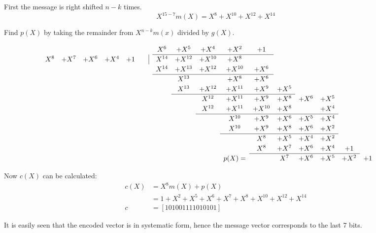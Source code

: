 \documentclass[Main]{subfiles}
\begin{document}
First the message is right shifted $n-k$ times.
\begin{equation}
X^{15-7}m(X) = X^8+X^{10}+X^{12}+X^{14}
\end{equation}

Find $p(X)$ by taking the remainder from $X^{n-k}m(x)$ divided by $g(X)$.

\[
\renewcommand\arraystretch{1.2}
\begin{array}{cccccccccccccccccc}
& & & & & X^6 & + X^5 &  +X^4 & +X^2 & +1 & & & & & & & \\
\cline{6-10}
 X^8 & + X^7 & +X^6 & +X^4 & +1 \qquad \vline & X^{14} & +X^{12} & +X^{10} & + X^8 & & & & & & & & \\
& & & & & X^{14} & + X^{13}& + X^{12} & +X^{10} & +X^6 & & & & & & & \\
\cline{6-10}
& & & & & & X^{13} & & +X^8 & +X^6 & & & & & & &\\
&  &&    &&    &  X^{13} & +X^{12} & +X^{11} & +X^9 & +X^5 & \\
\cline{7-11}
& & &&  &&    &  X^{12} & +X^{11} & +X^9 & +X^8 & +X^6 & +X^5  \\
& & &&  &&    &  X^{12} & +X^{11} & +X^{10} & +X^8 & & +X^4  \\
\cline{8-13}
&  &&    &    &   & &  & X^{10} & +X^9 & +X^6 & +X^5 & +X^4 \\
&  &&    &    &   & &  & X^{10} & +X^9 & +X^8 & +X^6 & +X^2 \\
\cline{9-13}
&  &&    &    &   & & & & X^{8} & +X^5 & +X^4 & +X^2 \\
&  &&    &    &   & & & & X^{8} & +X^7 & +X^6 & +X^4 & +1 \\
\cline{10-14}
&  &&  & & & & & p(X) = & & X^{7} & +X^6 & +X^5 & +X^2 & +1 \\
\end{array}
\]

Now $c(X)$ can be calculated:
\begin{align}
c(X) &= X^8m(X)+p(X)\\ 
	&= 1 + X^2 + X^5 + X^6 + X^7 + X^8 + X^{10}+ X^{12} + X^{14} \\
c &= [1 0 1 0 0 1 1 1 1 0 1 0 1 0 1]
\end{align}

It is easily seen that the encoded vector is in systematic form, hence the message vector corresponds to the last 7 bits.
\end{document}
